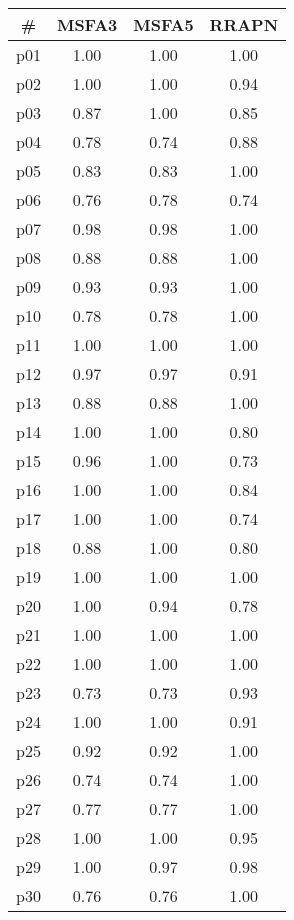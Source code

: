 \begin{tabular}{c||c|c|c}
\textbf{\#} & \textbf{MSFA3} & \textbf{MSFA5} & \textbf{RRAPN}\\
\hline
\hline
p01 & 1.00 & 1.00 & 1.00\\
p02 & 1.00 & 1.00 & 0.94\\
p03 & 0.87 & 1.00 & 0.85\\
p04 & 0.78 & 0.74 & 0.88\\
p05 & 0.83 & 0.83 & 1.00\\
p06 & 0.76 & 0.78 & 0.74\\
p07 & 0.98 & 0.98 & 1.00\\
p08 & 0.88 & 0.88 & 1.00\\
p09 & 0.93 & 0.93 & 1.00\\
p10 & 0.78 & 0.78 & 1.00\\
p11 & 1.00 & 1.00 & 1.00\\
p12 & 0.97 & 0.97 & 0.91\\
p13 & 0.88 & 0.88 & 1.00\\
p14 & 1.00 & 1.00 & 0.80\\
p15 & 0.96 & 1.00 & 0.73\\
p16 & 1.00 & 1.00 & 0.84\\
p17 & 1.00 & 1.00 & 0.74\\
p18 & 0.88 & 1.00 & 0.80\\
p19 & 1.00 & 1.00 & 1.00\\
p20 & 1.00 & 0.94 & 0.78\\
p21 & 1.00 & 1.00 & 1.00\\
p22 & 1.00 & 1.00 & 1.00\\
p23 & 0.73 & 0.73 & 0.93\\
p24 & 1.00 & 1.00 & 0.91\\
p25 & 0.92 & 0.92 & 1.00\\
p26 & 0.74 & 0.74 & 1.00\\
p27 & 0.77 & 0.77 & 1.00\\
p28 & 1.00 & 1.00 & 0.95\\
p29 & 1.00 & 0.97 & 0.98\\
p30 & 0.76 & 0.76 & 1.00\\
\end{tabular}

